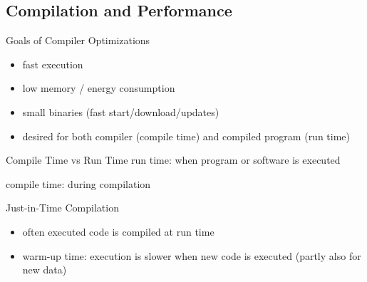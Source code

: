 \subsection{Compilation and Performance}
\begin{frame}{\insertsubsection}
	\vspace{-10mm}
	\begin{fancycolumns}
		\vspace{15mm}
		\begin{note}{Goals of Compiler Optimizations}
			\begin{itemize}
				\item fast execution
				\item low memory / energy consumption
				\item small binaries (fast start/download/updates)
				\item desired for both compiler (compile time) and compiled program (run time)
			\end{itemize}
		\end{note}
		
		
		\begin{definition}{Compile Time vs Run Time}
			run time: when program or software is executed
			
			compile time: during compilation
		\end{definition}
		\nextcolumn
		\hfill\resizebox{60mm}{!}{\figJIT}
		
		\begin{definition}{Just-in-Time Compilation}
			\begin{itemize}
				\item often executed code is compiled at run time
				\item warm-up time: execution is slower when new code is executed (partly also for new data)
			\end{itemize}
		\end{definition}
	\end{fancycolumns}
\end{frame}

